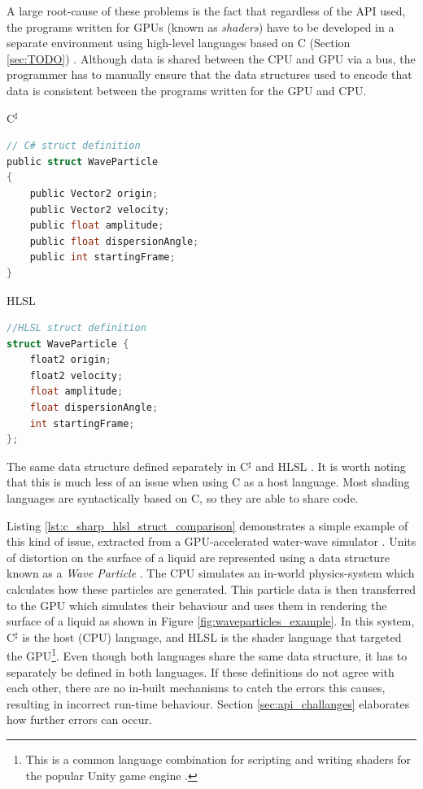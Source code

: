 \documentclass[a4paper,12pt,twoside,openright]{report}
\begin{document}
A large root-cause of these problems is the fact that regardless of the API
used, the programs written for GPUs (known as \textit{shaders}) have to be
developed in a separate environment using high-level languages based on C
(Section \ref{sec:TODO}) \cite{TripThroughGraphicsPipeline1}. Although data is
shared between the CPU and GPU via a bus, the programmer has to manually ensure
that the data structures used to encode that data is consistent between the
programs written for the GPU and CPU.

\begin{lstfloat}
\begin{center} C$^\sharp$ \end{center}
\begin{lstlisting}[language=C]
// C# struct definition
public struct WaveParticle
{
    public Vector2 origin;
    public Vector2 velocity;
    public float amplitude;
    public float dispersionAngle;
    public int startingFrame;
}
\end{lstlisting}
\begin{center} HLSL \end{center}
\begin{lstlisting}[language=C]
//HLSL struct definition
struct WaveParticle {
    float2 origin;
    float2 velocity;
    float amplitude;
    float dispersionAngle;
    int startingFrame;
};
\end{lstlisting}
\caption{The same data structure defined separately in C$^\sharp$ and HLSL
\cite{WaveParticlesGPU}. It is worth noting that this is much less of an issue
when using C as a host language. Most shading languages are
syntactically based on C, so they are able to share code.}
\label{lst:c_sharp_hlsl_struct_comparison}
\end{lstfloat}

Listing \ref{lst:c_sharp_hlsl_struct_comparison} demonstrates a simple example
of this kind of issue, extracted from a GPU-accelerated water-wave simulator
\cite{WaveParticlesGPU}. Units of distortion on the surface of a liquid are
represented using a data structure known as a \textit{Wave Particle}
\cite{WaveParticlesOriginalPaper}. The CPU simulates an in-world physics-system
which calculates how these particles are generated. This particle data is then
transferred to the GPU which simulates their behaviour and uses them in
rendering the surface of a liquid as shown in Figure
\ref{fig:waveparticles_example}. In this system, C$^\sharp$ is the host (CPU)
language, and HLSL is the shader language that targeted the GPU\footnote{This
is a common language combination for scripting and writing shaders for the
popular Unity game engine\cite{UnityScripting} \cite{UnityShaders}.}. Even
though both languages share the same data structure, it has to separately be
defined in both languages. If these definitions do not agree with each other,
there are no in-built mechanisms to catch the errors this causes, resulting in
incorrect run-time behaviour. Section \ref{sec:api_challanges} elaborates how
further errors can occur.
\end{document}
